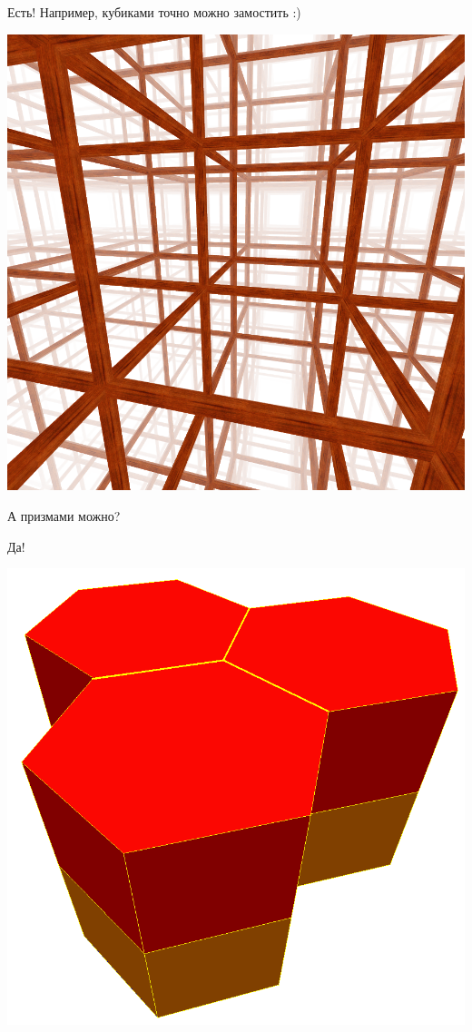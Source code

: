 \documentclass{beamer}
\begin{document}
\begin{frame}

Есть! Например, кубиками точно можно замостить :)


\begin{center}
\includegraphics[width=.6\textwidth]{Cubic_honeycomb.png}
\end{center}

\end{frame}

\begin{frame}

А призмами можно?

\pause

Да!

\medskip

\begin{center}
\includegraphics[width=.6\textwidth]{Hexagonal_prismatic_honeycomb.png}
\end{center}

\end{frame}
\end{document}
